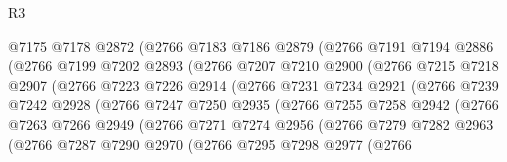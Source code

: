 \begin{lexlean}{R3}
\begin{coremodule}
                    @7175
                    @7178
                    @2872
                    (@2766
                      @7183
                      @7186
                      @2879
                      (@2766
                        @7191
                        @7194
                        @2886
                        (@2766
                          @7199
                          @7202
                          @2893
                          (@2766
                            @7207
                            @7210
                            @2900
                            (@2766
                              @7215
                              @7218
                              @2907
                              (@2766
                                @7223
                                @7226
                                @2914
                                (@2766
                                  @7231
                                  @7234
                                  @2921
                                  (@2766
                                    @7239
                                    @7242
                                    @2928
                                    (@2766
                                      @7247
                                      @7250
                                      @2935
                                      (@2766
                                        @7255
                                        @7258
                                        @2942
                                        (@2766
                                          @7263
                                          @7266
                                          @2949
                                          (@2766
                                            @7271
                                            @7274
                                            @2956
                                            (@2766
                                              @7279
                                              @7282
                                              @2963
                                              (@2766
                                                @7287
                                                @7290
                                                @2970
                                                (@2766
                                                  @7295
                                                  @7298
                                                  @2977
                                                  (@2766

\end{coremodule}
\end{lexlean}
